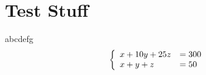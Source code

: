 \documentclass{article}
\author{Spencer Lawry}
\begin{document}
\section*{Test Stuff}
abcdefg \\
\begin{equation}
\left\{ \begin{array}{ll}
x + 10y + 25z &= 300\\
x + y + z &= 50
\end{array}\right.
\end{equation}
\end{document}
